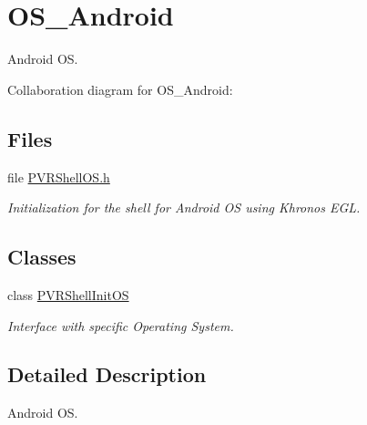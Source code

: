 \hypertarget{group___o_s___android}{\section{O\+S\+\_\+\+Android}
\label{group___o_s___android}
}


Android O\+S.  


Collaboration diagram for O\+S\+\_\+\+Android\+:
\subsection*{Files}
\begin{DoxyCompactItemize}
\item 
file \hyperlink{_android_2_p_v_r_shell_o_s_8h}{P\+V\+R\+Shell\+O\+S.\+h}
\begin{DoxyCompactList}\small\item\em Initialization for the shell for Android O\+S using Khronos E\+G\+L. \end{DoxyCompactList}\end{DoxyCompactItemize}
\subsection*{Classes}
\begin{DoxyCompactItemize}
\item 
class \hyperlink{class_p_v_r_shell_init_o_s}{P\+V\+R\+Shell\+Init\+O\+S}
\begin{DoxyCompactList}\small\item\em Interface with specific Operating System. \end{DoxyCompactList}\end{DoxyCompactItemize}


\subsection{Detailed Description}
Android O\+S. 

